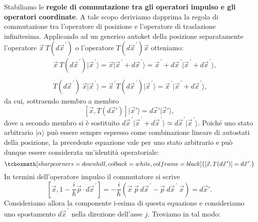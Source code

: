 Stabiliamo le \textbf{regole di commutazione tra gli operatori impulso e gli operatori coordinate}. A tale scopo deriviamo dapprima la regola di commutazione tra l'operatore di posizione e l'operatore di traslazione infinitesima. Applicando ad un generico autoket della posizione separatamente l'operatore $\vec{x}\ T(d{\vec{x}}^{\, \prime})$ o l'operatore $T(d{\vec{x}}^{\, \prime})\vec{x}$ otteniamo:
	\begin{eqnarray}
		& & \vec{x}\ T(d{\vec{x}}^{\, \prime})\vert {\vec{x}}^{\, \prime} \rangle = \vec{x}\vert{\vec{x}}^{\, \prime}+d{\vec{x}}^{\, \prime}\rangle ={\vec{x}}^{\, \prime}+d{\vec{x}}^{\, \prime}\vert{\vec{x}}^{\, \prime}+d{\vec{x}}^{\, \prime}\rangle ,  \\
 \nonumber \\
		& & T(d{\vec{x}}^{\, \prime})\ \vec{x} \vert {\vec{x}}^{\, \prime} \rangle = {\vec{x}}^{\, \prime} T(d{\vec{x}}^{\, \prime})\vert {\vec{x}}^{\, \prime}\rangle = {\vec{x}}^{\, \prime}\vert {\vec{x}}^{\, \prime}+d{\vec{x}}^{\, \prime}\rangle ,
	\end{eqnarray}
da cui, sottraendo membro a membro
	\begin{equation}
		\left[\vec{x}, T(d\vec{x}')\right]\vert \vec{x}' \rangle = d\vec{x}' \vert \vec{x}' \rangle ,
	\end{equation}
dove a secondo membro si è sostituito $d{\vec{x}}^{\, \prime} \vert {\vec{x}}^{\, \prime}+d{\vec{x}}^{\, \prime}\rangle \simeq d{\vec{x}}^{\, \prime} \vert {\vec{x}}^{\, \prime}\rangle$. Poiché uno stato arbitrario $\vert \alpha \rangle $ può essere sempre espresso come combinazione lineare di autostati della posizione, la precedente equazione vale per uno stato arbitrario e può dunque essere considerata un'identità operatoriale:
	\begin{equation}
		\tcboxmath[sharp corners=downhill, colback=white, colframe=black]{	
			\left[\vec{x}, T(d{\vec{x}}^{\, \prime})\right] = d{\vec{x}}^{\, \prime} .
			}
	\end{equation}
In termini dell'operatore impulso il commutatore si scrive
	\begin{equation}
		\left[ \vec{x}, 1- \frac{i}{\hbar}\vec{p}\cdot d{\vec{x}}^{\, \prime}\right] =-\frac{i}{\hbar}\left(\vec{x}\ \vec{p}\ d{\vec{x}}^{\, \prime}-\vec{p}\ d{\vec{x}}^{\, \prime}\ \vec{x} \right) =d\vec{x}' .
	\end{equation}
Consideriamo allora la componente i-esima di questa equazione e consideriamo uno spostamento $d{\vec{x}}^{\, \prime}$ nella direzione dell'asse $j$. Troviamo in tal modo:
